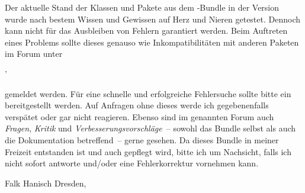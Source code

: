 Der aktuelle Stand der Klassen und Pakete aus dem \TUDScript-Bundle in der 
Version~\vTUDScript{} wurde nach bestem Wissen und Gewissen auf Herz und Nieren 
getestet. Dennoch kann nicht für das Ausbleiben von Fehlern garantiert werden. 
Beim Auftreten eines Problems sollte dieses genauso wie Inkompatibilitäten mit 
anderen Paketen im Forum unter
\begin{quoting}
\Forum'%
\end{quoting}
gemeldet werden. Für eine schnelle und erfolgreiche Fehlersuche sollte bitte 
ein  
bereitgestellt werden. Auf Anfragen ohne dieses werde ich gegebenenfalls 
verspätet oder gar nicht reagieren. Ebenso sind im genannten Forum auch 
\emph{Fragen}, \emph{Kritik} und \emph{Verbesserungsvorschläge}~-- sowohl das 
Bundle selbst als auch die Dokumentation betreffend~-- gerne gesehen. Da dieses 
Bundle in meiner Freizeit entstanden ist und auch gepflegt wird, bitte ich um 
Nachsicht, falls ich nicht sofort antworte und/oder eine Fehlerkorrektur 
vornehmen kann.

\makeatletter
\medskip
\noindent Falk Hanisch\newline
Dresden, \@date
\makeatother
